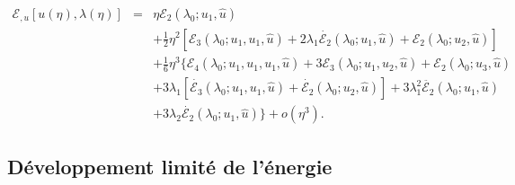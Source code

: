 \documentclass{article}
\newcommand{\nobracket}{}
\newcommand{\nosymbol}{}
\begin{document}
\begin{eqnarray}
  \mathcal{E}_{, u} [u (\eta), \lambda (\eta)] & = & \eta \mathcal{E}_2
  (\lambda_0 ; u_1, \hat{u}) \nonumber\\
  &  & \nosymbol + \tfrac{1}{2} \eta^2  [\mathcal{E}_3 (\lambda_0 ; u_1, u_1,
  \hat{u}) + 2 \lambda_1  \dot{\mathcal{E}_2} (\lambda_0 ; u_1, \hat{u})
  +\mathcal{E}_2 (\lambda_0 ; u_2, \hat{u})] \nonumber\\
  &  & \nosymbol + \tfrac{1}{6} \eta^3  \{ \mathcal{E}_4 (\lambda_0 ; u_1,
  u_1, u_1, \hat{u}) + 3\mathcal{E}_3 (\lambda_0 ; u_1, u_2, \hat{u})
  \nobracket +\mathcal{E}_2 (\lambda_0 ; u_3, \hat{u}) \nonumber\\
  &  & \nosymbol + 3 \lambda_1  [\dot{\mathcal{E}_3} (\lambda_0 ; u_1, u_1,
  \hat{u}) + \dot{\mathcal{E}_2} (\lambda_0 ; u_2, \hat{u})] + 3 \lambda_1^2
  \ddot{\mathcal{E}_2} (\lambda_0 ; u_1, \hat{u}) \nonumber\\
  &  & \nobracket \nosymbol + 3 \lambda_2  \dot{\mathcal{E}_2} (\lambda_0 ;
  u_1, \hat{u}) \} + o (\eta^3) .  \label{eq20220107080901}
\end{eqnarray}
\subsection{Développement limité de l'énergie}\label{sec:DL
energie}
\end{document}
